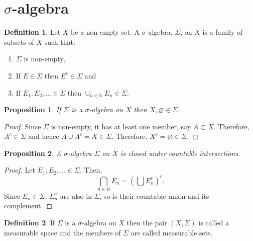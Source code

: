 \documentclass{article}
\theoremstyle{plain}
\numberwithin{thm}{section}
\theoremstyle{plain}
\newtheorem{prop}{Proposition}
\numberwithin{prop}{section}
\theoremstyle{definition}
\newtheorem{defn}{Definition}
\numberwithin{defn}{section}
\theoremstyle{remark}
\numberwithin{equation}{section}
\begin{document}
\section{$\sigma$-algebra}\label{s1}
\begin{defn}\label{s1d1}
Let $X$ be a non-empty set. A $\sigma$-algebra, $\Sigma$, on $X$ is a family
of subsets of $X$ such that:
\begin{enumerate}
\item $\Sigma$ is non-empty,
\item If $E \in \Sigma$ then $E^c \in \Sigma$ and
\item If $E_1, E_2, \ldots \in \Sigma$ then $\cup_{n \in \mathbb{N}}E_n \in \Sigma$. 
\end{enumerate}
\end{defn}
\begin{prop}\label{s1p1}
If $\Sigma$ is a $\sigma$-algebra on $X$ then $X, \varnothing \in \Sigma$.
\end{prop}
\begin{proof}
Since $\Sigma$ is non-empty, it has at least one member, say $A \subset X$. 
Therefore, $A^c \in \Sigma$ and hence $A \cup A^c = X \in \Sigma$. 
Therefore, $X^c = \varnothing \in \Sigma$.
\end{proof}

\begin{prop}\label{s1p2}
A $\sigma$-algebra $\Sigma$ on $X$ is closed under countable intersections.
\end{prop}
\begin{proof}
Let $E_1, E_2, \ldots \in \Sigma$. Then,
\[
\bigcap_{n \in \mathbb{N}}E_n = \left(\bigcup E_n^c\right)^c.
\]
Since $E_n \in \Sigma$, $E_n^c$ are also in $\Sigma$, so is their
countable union and its complement.
\end{proof}

\begin{defn}\label{s1d2}
If $\Sigma$ is a $\sigma$-algebra on $X$ then the pair $(X, \Sigma)$
is called a measurable space and the members of $\Sigma$ are called measurable
sets.
\end{defn}
\end{document}
